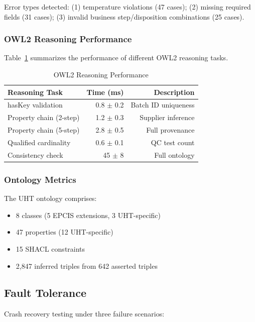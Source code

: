 \documentclass[preprint,review,12pt,authoryear]{elsarticle}
\begin{document}
Error types detected: (1) temperature violations (47 cases); (2) missing required fields (31 cases); (3) invalid business step/disposition combinations (25 cases).

\subsubsection{OWL2 Reasoning Performance}

Table~\ref{tab:reasoning} summarizes the performance of different OWL2 reasoning tasks.

\begin{table}[htbp]
\centering
\caption{OWL2 Reasoning Performance}
\label{tab:reasoning}
\begin{tabular}{@{}lrr@{}}
\toprule
\textbf{Reasoning Task} & \textbf{Time (ms)} & \textbf{Description} \\
\midrule
hasKey validation & 0.8 $\pm$ 0.2 & Batch ID uniqueness \\
Property chain (2-step) & 1.2 $\pm$ 0.3 & Supplier inference \\
Property chain (5-step) & 2.8 $\pm$ 0.5 & Full provenance \\
Qualified cardinality & 0.6 $\pm$ 0.1 & QC test count \\
Consistency check & 45 $\pm$ 8 & Full ontology \\
\bottomrule
\end{tabular}
\end{table}

\subsubsection{Ontology Metrics}

The UHT ontology comprises:
\begin{itemize}
    \item 8 classes (5 EPCIS extensions, 3 UHT-specific)
    \item 47 properties (12 UHT-specific)
    \item 15 SHACL constraints
    \item 2,847 inferred triples from 642 asserted triples
\end{itemize}

\subsection{Fault Tolerance}

Crash recovery testing under three failure scenarios:
\end{document}
